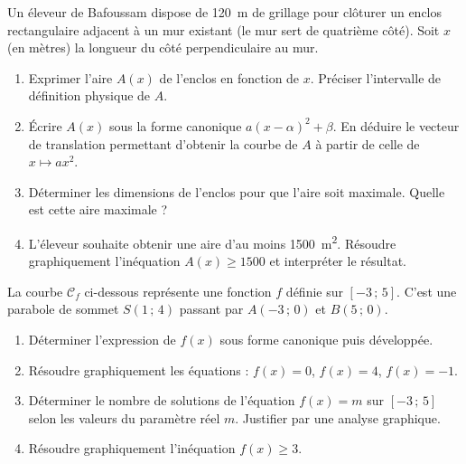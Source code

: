 \documentclass[11pt]{article}
\begin{document}
\begin{exercice}
Un éleveur de Bafoussam dispose de \SI{120}{m} de grillage pour clôturer un enclos rectangulaire adjacent à un mur existant (le mur sert de quatrième côté). Soit $x$ (en mètres) la longueur du côté perpendiculaire au mur.
\begin{enumerate}
    \item Exprimer l'aire $A(x)$ de l'enclos en fonction de $x$. Préciser l'intervalle de définition physique de $A$.
    \item Écrire $A(x)$ sous la forme canonique $a(x-\alpha)^2 + \beta$. En déduire le vecteur de translation permettant d'obtenir la courbe de $A$ à partir de celle de $x \mapsto ax^2$.
    \item Déterminer les dimensions de l'enclos pour que l'aire soit maximale. Quelle est cette aire maximale ?
    \item L'éleveur souhaite obtenir une aire d'au moins \SI{1500}{m^2}. Résoudre graphiquement l'inéquation $A(x) \geq 1500$ et interpréter le résultat.
\end{enumerate}
\end{exercice}

\begin{exercice}
La courbe $\mathcal{C}_f$ ci-dessous représente une fonction $f$ définie sur $[-3\,;\,5]$. C'est une parabole de sommet $S(1\,;\,4)$ passant par $A(-3\,;\,0)$ et $B(5\,;\,0)$.
\begin{center}
\end{center}
\begin{enumerate}
    \item Déterminer l'expression de $f(x)$ sous forme canonique puis développée.
    \item Résoudre graphiquement les équations : $f(x) = 0$, $f(x) = 4$, $f(x) = -1$.
    \item Déterminer le nombre de solutions de l'équation $f(x) = m$ sur $[-3\,;\,5]$ selon les valeurs du paramètre réel $m$. Justifier par une analyse graphique.
    \item Résoudre graphiquement l'inéquation $f(x) \geq 3$.
\end{enumerate}
\end{exercice}
\end{document}
